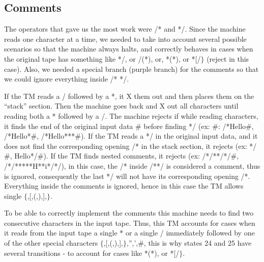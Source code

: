 \documentclass{article}
\begin{document}
\subsection{Comments}

The operators that gave us the most work were /* and */. Since the machine reads one character at a time, we needed to take into account several possible scenarios 
so that the machine always halts, and correctly behaves in cases when the original tape has something like *{/}, or /(*), or, *(*), or *[/$\}$ (reject in this case). 
Also, we needed a special branch (purple branch) for the comments so that we could 
ignore everything inside /* */.

If the TM reads a / followed by a *, it X them out and then places them on the “stack” section. Then the machine goes back and X out all characters 
until reading both a * followed by a /. The machine rejects if while reading characters, it finds the end of the original input data $\#$ before finding */ 
(ex: $\#$: /*Hello$\#$, /*Hello*$\#$, /*Hello***$\#$). If the TM reads a */ in the original input data, and it does not find the corresponding opening 
/* in the stack section, it rejects (ex: */$\#$, Hello*/$\#$). If the TM finds nested comments, it rejects (ex: /*/**/*/$\#$, /*/*****H**i*/*/), in this case, the /* inside /**/ 
is considered a comment, thus is ignored, consequently the last */ will not have its corresponding opening /*. Everything inside the comments is ignored, hence in this 
case the TM allows single $\{$,[,(,),],$\}$. 

To be able to correctly implement the comments this machine needs to find two consecutive characters in the input tape. Thus, this TM accounts for cases when it reads from the input tape a single * or a single / immediately followed by one of the other special characters  $\{$,[,(,),],$\}$,”,’,$\#$, this is why states 24 and 25 have several transitions - to account for cases like *(*), or *[/$\}$.
\end{document}
